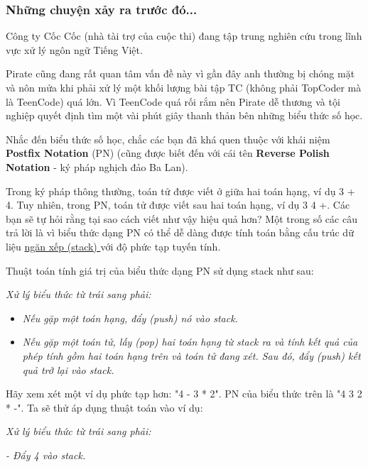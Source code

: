 



\subsubsection{   Những chuyện xảy ra trước đó...  }

   Công ty Cốc Cốc (nhà tài trợ của cuộc thi) đang tập trung nghiên cứu trong lĩnh vực xử lý ngôn ngữ Tiếng Việt.  

   Pirate cũng đang rất quan tâm vấn đề này vì gần đây anh thường bị chóng mặt và nôn mửa khi phải xử lý một khối lượng bài tập TC (không phải TopCoder mà là TeenCode) quá lớn. Vì TeenCode quá rối rắm nên Pirate dễ thương và tội nghiệp quyết định tìm một vài phút giây thanh thản bên những biểu thức số học.  

   Nhắc đến biểu thức số học, chắc các bạn đã khá quen thuộc với khái niệm   \textbf{    Postfix Notation   }   (PN) (cũng được biết đến với cái tên   \textbf{    Reverse Polish Notation   }   - ký pháp nghịch đảo Ba Lan).  

   Trong ký pháp thông thường, toán tử được viết ở giữa hai toán hạng, ví dụ 3 + 4. Tuy nhiên, trong PN, toán tử được viết sau hai toán hạng, ví dụ 3 4 +. Các bạn sẽ tự hỏi rằng tại sao cách viết như vậy hiệu quả hơn? Một trong số các câu trả lời là vì biểu thức dạng PN có thể dễ dàng được tính toán bằng cấu trúc dữ liệu   \href{http://www.cosc.canterbury.ac.nz/mukundan/dsal/StackAppl.html}{    ngăn xếp (stack)   }   với độ phức tạp tuyến tính.  

   Thuật toán tính giá trị của biểu thức dạng PN sử dụng stack như sau:  

\emph{     Xử lý biểu thức từ trái sang phải:    }
\begin{itemize}
	\item \emph{      Nếu gặp một toán hạng, đẩy (push) nó vào stack.     }
	\item \emph{      Nếu gặp một toán tử, lấy (pop) hai toán hạng từ stack ra và tính kết quả của phép tính gồm hai toán hạng trên và toán tử đang xét. Sau đó, đẩy (push) kết quả trở lại vào stack.     }
\end{itemize}

   Hãy xem xét một ví dụ phức tạp hơn: "4 - 3 * 2". PN của biểu thức trên là "4 3 2 * -". Ta sẽ thử áp dụng thuật toán vào ví dụ:  

\emph{    Xử lý biểu thức từ trái sang phải:   }

\emph{    - Đẩy 4 vào stack.   }

